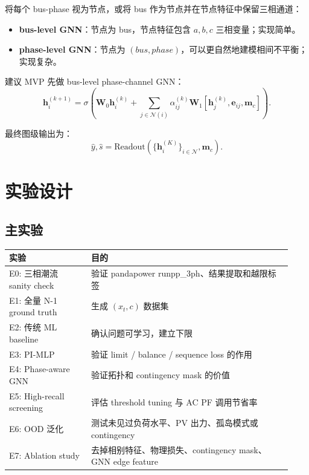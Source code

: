 \documentclass[UTF8,11pt]{ctexart}
\begin{document}
将每个 bus-phase 视为节点，或将 bus 作为节点并在节点特征中保留三相通道：

\begin{itemize}
    \item \textbf{bus-level GNN}：节点为 bus，节点特征包含 $a,b,c$ 三相变量；实现简单。
    \item \textbf{phase-level GNN}：节点为 $(bus,phase)$，可以更自然地建模相间不平衡；实现复杂。
\end{itemize}

建议 MVP 先做 bus-level phase-channel GNN：
\begin{equation}
    \bm{h}^{(k+1)}_i = \sigma\left(\bm{W}_0\bm{h}^{(k)}_i + \sum_{j\in\mathcal{N}(i)} \alpha_{ij}^{(k)} \bm{W}_1 [\bm{h}^{(k)}_j, \bm{e}_{ij}, \bm{m}_c]\right).
\end{equation}

最终图级输出为：
\begin{equation}
    \hat{y},\hat{s}=\mathrm{Readout}(\{\bm{h}_i^{(K)}\}_{i\in\mathcal{N}},\bm{m}_c).
\end{equation}

\section{实验设计}

\subsection{主实验}

\begin{center}
\begin{tabular}{>{\raggedright\arraybackslash}p{0.27\linewidth}>{\raggedright\arraybackslash}p{0.66\linewidth}}
\toprule
实验 & 目的 \\
\midrule
E0: 三相潮流 sanity check & 验证 pandapower runpp\_3ph、结果提取和越限标签 \\
E1: 全量 N-1 ground truth & 生成 $(x_t,c)$ 数据集 \\
E2: 传统 ML baseline & 确认问题可学习，建立下限 \\
E3: PI-MLP & 验证 limit / balance / sequence loss 的作用 \\
E4: Phase-aware GNN & 验证拓扑和 contingency mask 的价值 \\
E5: High-recall screening & 评估 threshold tuning 与 AC PF 调用节省率 \\
E6: OOD 泛化 & 测试未见过负荷水平、PV 出力、孤岛模式或 contingency \\
E7: Ablation study & 去掉相别特征、物理损失、contingency mask、GNN edge feature \\
\bottomrule
\end{tabular}
\end{center}
\end{document}

